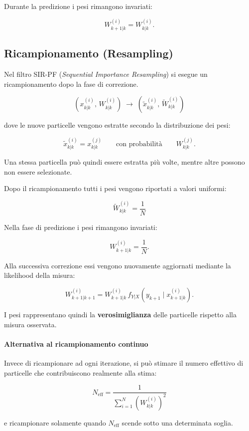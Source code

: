\documentclass[11pt,a4paper]{article}
\begin{document}
Durante la predizione i pesi rimangono invariati:

\[
W^{(i)}_{k+1|k}
=
W^{(i)}_{k|k}.
\]

\subsection{Ricampionamento (Resampling)}

Nel filtro SIR-PF (\emph{Sequential Importance Resampling}) si esegue un
ricampionamento dopo la fase di correzione.

\[
\left(x^{(i)}_{k|k},\,W^{(i)}_{k|k}\right)
\;\longrightarrow\;
\left(\tilde{x}^{(i)}_{k|k},\,\tilde{W}^{(i)}_{k|k}\right)
\]

dove le nuove particelle vengono estratte secondo la distribuzione dei
pesi:

\[
\tilde{x}^{(i)}_{k|k}
=
x^{(j)}_{k|k}
\qquad
\text{con probabilità}
\qquad
W^{(j)}_{k|k}.
\]

Una stessa particella può quindi essere estratta più volte, mentre altre
possono non essere selezionate.

Dopo il ricampionamento tutti i pesi vengono riportati a valori uniformi:

\[
\boxed{
\tilde{W}^{(i)}_{k|k}
=
\frac1N
}
\]

Nella fase di predizione i pesi rimangono invariati:

\[
W^{(i)}_{k+1|k}
=
\frac1N.
\]

Alla successiva correzione essi vengono nuovamente aggiornati mediante la
likelihood della misura:

\[
W^{(i)}_{k+1|k+1}
=
W^{(i)}_{k+1|k}\,
f_{Y|X}
\!\left(
y_{k+1}\mid x^{(i)}_{k+1|k}
\right).
\]

I pesi rappresentano quindi la \textbf{verosimiglianza} delle particelle
rispetto alla misura osservata.

\bigskip

\paragraph{Alternativa al ricampionamento continuo}

Invece di ricampionare ad ogni iterazione, si può stimare il numero
effettivo di particelle che contribuiscono realmente alla stima:

\[
\boxed{
N_{\mathrm{eff}}
=
\frac{1}
{\displaystyle\sum_{i=1}^{N}
\left(W^{(i)}_{k|k}\right)^2}
}
\]

e ricampionare solamente quando \(N_{\mathrm{eff}}\) scende sotto una
determinata soglia.
\end{document}
